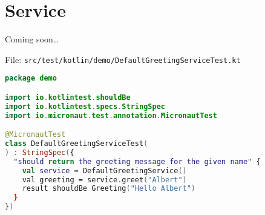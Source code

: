 \section{Service}\label{sec:service}

Coming soon\dots

File: \texttt{src/test/kotlin/demo/DefaultGreetingServiceTest.kt}
\begin{lstlisting}[language=Kotlin]
package demo

import io.kotlintest.shouldBe
import io.kotlintest.specs.StringSpec
import io.micronaut.test.annotation.MicronautTest

@MicronautTest
class DefaultGreetingServiceTest(
) : StringSpec({
  "should return the greeting message for the given name" {
    val service = DefaultGreetingService()
    val greeting = service.greet("Albert")
    result shouldBe Greeting("Hello Albert")
  }
})
\end{lstlisting}
